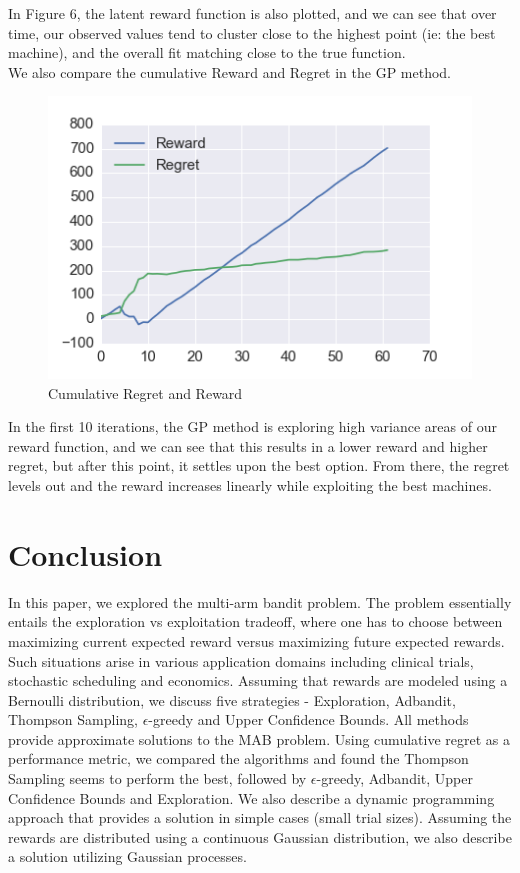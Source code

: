 \documentclass{article}
\begin{document}
In Figure 6, the latent reward function is also plotted, and we can see that over time, our observed values tend to cluster close to the highest point (ie: the best machine), and the overall fit matching close to the true function.\\

We also compare the cumulative Reward and Regret in the GP method.

\begin{figure}[H]
\centering
\includegraphics[scale=0.8]{reward_regret.png}
\caption{Cumulative Regret and Reward}
\end{figure}

In the first 10 iterations, the GP method is exploring high variance areas of our reward function, and we can see that this results in a lower reward and higher regret, but after this point, it settles upon the best option. From there, the regret levels out and the reward increases linearly while exploiting the best machines.

\section{Conclusion}

In this paper, we explored the multi-arm bandit problem. The problem essentially entails the exploration vs exploitation tradeoff, where one has to choose between maximizing current expected reward versus maximizing future expected rewards. Such situations arise in various application domains including clinical trials, stochastic scheduling and economics. Assuming that rewards are modeled using a Bernoulli distribution, we discuss five strategies -  Exploration, Adbandit, Thompson Sampling, $\epsilon$-greedy and Upper Confidence Bounds. All methods provide approximate solutions to the MAB problem. Using cumulative regret as a performance metric, we compared the algorithms and found the Thompson Sampling seems to perform the best, followed by $\epsilon$-greedy, Adbandit, Upper Confidence Bounds and  Exploration. We also describe a dynamic programming approach that provides a solution in simple cases \big(small trial sizes\big). Assuming the rewards are distributed using a continuous Gaussian distribution, we also describe a solution utilizing Gaussian processes. 
\end{document}
